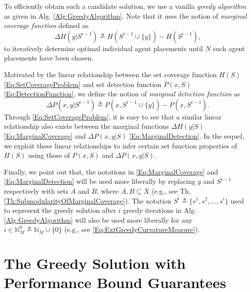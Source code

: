 \documentclass[letterpaper, 10 pt, conference]{ieeeconf}
\newcommand{\N}{\mathbb{N}}
\begin{document}
To efficiently obtain such a candidate solution, we use a vanilla \emph{greedy algorithm} as given in Alg. \ref{Alg:GreedyAlgorithm}. Note that it uses the notion of \emph{marginal coverage function} defined as
\begin{equation}\label{Eq:MarginalCoverage}
    \Delta H(y \vert S^{i-1}) \triangleq H(S^{i-1}\cup\{y\}) - H(S^{i-1}),
\end{equation}
to iteratively determine optimal individual agent placements until $N$ such agent placements have been chosen.  


Motivated by the linear relationship between the set coverage function $H(S)$ \eqref{Eq:SetCoverageProblem} and set detection function $P(x,S)$ \eqref{Eq:DetectionFunction}, we define the notion of \emph{marginal detection function} as 
\begin{equation}\label{Eq:MarginalDetection}
    \Delta P(x, y \vert S^{i-1}) \triangleq P(x, S^{i-1}\cup\{y\}) - P(x, S^{i-1}).
\end{equation}
Through \eqref{Eq:SetCoverageProblem}, it is easy to see that a similar linear relationship also exists between the marginal functions $\Delta H(y \vert S)$ \eqref{Eq:MarginalCoverage} and $\Delta P(x,y\vert S)$ \eqref{Eq:MarginalDetection}. In the sequel, we exploit these linear relationships to infer certain set function properties of $H(S)$ using those of $P(x,S)$ and $\Delta P(x,y\vert S)$. 

Finally, we point out that, the notations in \eqref{Eq:MarginalCoverage} and \eqref{Eq:MarginalDetection} will be used more liberally by replacing $y$ and $S^{i-1}$ respectively with sets $A$ and $B$, where $A,B\subseteq X$ (e.g., see Th. \ref{Th:SubmodularityOfMarginalCoverage}). The notation $S^i \triangleq \{s^1,s^2,\ldots,s^i\}$ used to represent the greedy solution after $i$ greedy iterations in Alg. \ref{Alg:GreedyAlgorithm} will also be used more liberally for any $i\in\N_M^0 \triangleq \N_M\cup\{0\}$ (e.g., see \eqref{Eq:ExtGreedyCurvatureMeasure}). 





\section{The Greedy Solution with Performance Bound Guarantees}
\label{Sec:Preliminaries}
\end{document}
